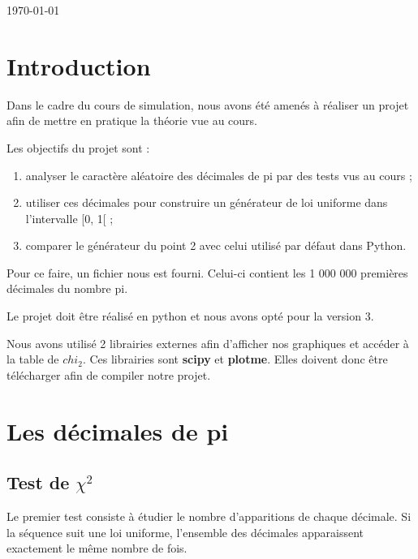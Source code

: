 \documentclass[10pt,a4paper]{article}
\begin{document}
\begin{titlepage}
\begin{sffamily}
\begin{center}
				\vfill
				
				{\large \today}
				
			\end{center}
		\end{sffamily}
	\end{titlepage}
	
	\newpage
	\tableofcontents
	
	\newpage
	\section{Introduction}
	Dans le cadre du cours de simulation, nous avons été amenés à réaliser un projet afin de mettre en pratique la théorie vue au cours.
	
	Les objectifs du projet sont :
	\begin{enumerate}
		\item analyser le caractère aléatoire des décimales de pi par des tests vus au cours ;
		\item utiliser ces décimales pour construire un générateur de loi uniforme dans l'intervalle [0, 1[ ;
		\item comparer le générateur du point 2 avec celui utilisé par défaut dans Python.
	\end{enumerate}
	
	Pour ce faire, un fichier nous est fourni. Celui-ci contient les 1 000 000 premières décimales du nombre pi.
	
	Le projet doit être réalisé en python et nous avons opté pour la version 3.

	Nous avons utilisé 2 librairies externes afin d'afficher nos graphiques et accéder à la table de $chi_2$. Ces librairies sont \textbf{scipy} et \textbf{plotme}. Elles doivent donc être télécharger afin de compiler notre projet. %
	
	\newpage
	\section{Les décimales de pi}
	
	\subsection{Test de $\chi^2$}
	Le premier test consiste à étudier le nombre d'apparitions de chaque décimale. Si la séquence suit une loi uniforme, l'ensemble des décimales apparaissent exactement le même nombre de fois.
	
\end{document}
